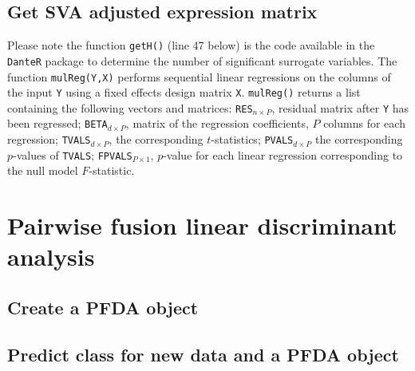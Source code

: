 \documentclass[12pt,a4paper,oneside]{report}
\begin{document}
\begin{appendix}

\clearpage

\subsection{Get SVA adjusted expression matrix}

Please note the function \texttt{getH()} (line 47 below) is the code available in the \texttt{DanteR} package to determine the number of significant surrogate variables. The function \texttt{mulReg(Y,X)} performs sequential linear regressions on the columns of the input \texttt{Y} using a fixed effects design matrix \texttt{X}. \texttt{mulReg()} returns a list containing the following vectors and matrices: \texttt{RES}$_{n \times P}$, residual matrix after \texttt{Y} has been regressed; \texttt{BETA}$_{d \times P}$, matrix of the regression coefficients, $P$ columns for each regression; \texttt{TVALS}$_{d \times P}$, the corresponding $t$-statistics; \texttt{PVALS}$_{d \times P}$ the corresponding $p$-values of \texttt{TVALS}; \texttt{FPVALS}$_{P\times 1}$, $p$-value for each linear regression corresponding to the null model $F$-statistic.

	
	
	
	
	
	
\clearpage



\section{Pairwise fusion linear discriminant analysis} 



\clearpage

\subsection{Create a PFDA object}

	

\clearpage

\subsection{Predict class for new data and a PFDA object}


\end{appendix}
\end{document}
